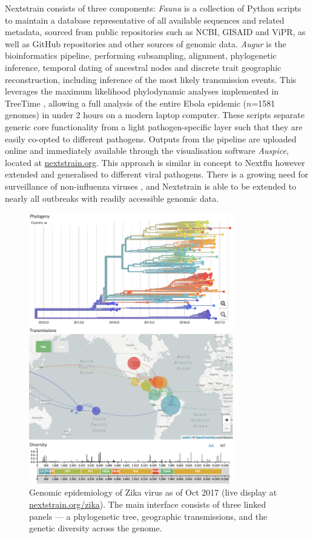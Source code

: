\documentclass[11pt,oneside,letterpaper]{article}
\begin{document}
Nextstrain consists of three components:
\textit{Fauna} is a collection of Python scripts to maintain a database representative of all available sequences and related metadata, sourced from public repositories such as NCBI, GISAID and ViPR, as well as GitHub repositories and other sources of genomic data.
\textit{Augur} is the bioinformatics pipeline, performing subsampling, alignment, phylogenetic inference, temporal dating of ancestral nodes and discrete trait geographic reconstruction, including inference of the most likely transmission events.
This leverages the maximum likelihood phylodynamic analyses implemented in TreeTime \citep{sagulenko2017treetime}, allowing a full analysis of the entire Ebola epidemic ($n$=1581 genomes) in under 2 hours on a modern laptop computer.
These scripts separate generic core functionality from a light pathogen-specific layer such that they are easily co-opted to different pathogens.
Outputs from the pipeline are uploaded online and immediately available through the visualisation software \textit{Auspice}, located at \href{http://nextstrain.org}{nextstrain.org}.
This approach is similar in concept to Nextflu \citep{neher2015nextflu} however extended and generalised to different viral pathogens.
There is a growing need for surveillance of non-influenza viruses \citep{tang2017global}, and Nextstrain is able to be extended to nearly all outbreaks with readily accessible genomic data.

\begin{figure}[t]
\centerline{\includegraphics[width=0.8\textwidth]{figure}}
\caption{Genomic epidemiology of Zika virus as of Oct 2017 (live display at \href{http://nextstrain.org/zika}{nextstrain.org/zika}). The main interface consists of three linked panels --- a phylogenetic tree, geographic transmissions, and the genetic diversity across the genome.}
\label{nextstrain}
\end{figure}
\end{document}

